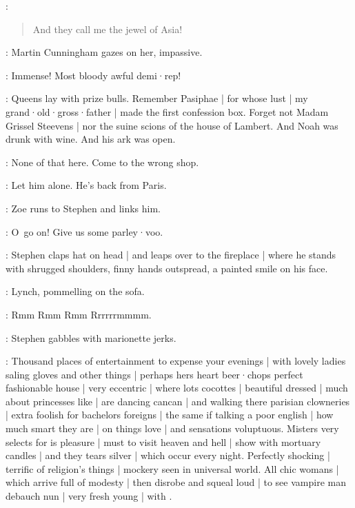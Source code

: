 \MrsCunningham:
\begin{verse}
    And they call me the jewel of Asia!
\end{verse}

:
Martin Cunningham gazes on her,
impassive.

\MartinCunningham:
Immense!
Most bloody awful demi·rep!


\Stephen:
Queens lay with prize bulls.
Remember Pasiphae |
for whose lust |
my grand·old·gross·father |
made the first confession box.
Forget not Madam Grissel Steevens |
nor the suine scions of the house of Lambert.
And Noah was drunk with wine.
And his ark was open.

\Bella:
None of that here.
Come to the wrong shop.

\Lynch:
Let him alone.
He's back from Paris.

:
Zoe runs to Stephen and links him.

\Zoe:
O~go on!
Give us some parley·voo.

:
Stephen claps hat on head |
and leaps over to the fireplace |
where he stands with shrugged shoulders,
finny hands outspread,
a painted smile on his face.

:
Lynch,
pommelling on the sofa.

\Lynch:
Rmm Rmm Rmm Rrrrrrmmmm.

:
Stephen gabbles with marionette jerks.

\Stephen:
Thousand places of entertainment to expense your evenings |
with lovely ladies saling gloves and other things |
perhaps hers heart beer·chops perfect fashionable house |
very eccentric |
where lots cocottes |
beautiful dressed |
much about princesses like |
are dancing cancan |
and walking there parisian clowneries |
extra foolish for bachelors foreigns |
the same if talking a poor english |
how much smart they are |
on things love |
and sensations voluptuous.
Misters very selects for is pleasure |
must to visit heaven and hell |
show with mortuary candles |
and they tears silver |
which occur every night.
%
Perfectly shocking |
terrific of religion's things |
mockery seen in universal world.
All chic womans |
which arrive full of modesty |
then disrobe and squeal loud |
to see vampire man debauch nun |
very fresh young |
with .


